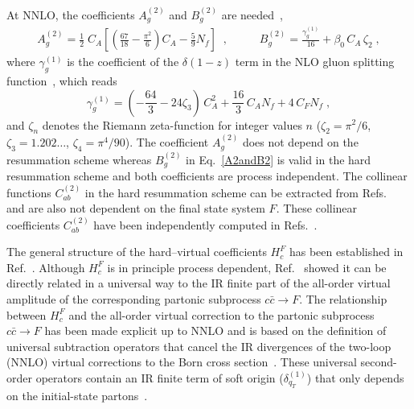 \documentclass[12pt]{article}
\def\beeq{\begin{eqnarray}}
\def\eeeq{\end{eqnarray}}
\newcommand\f[2]{\frac{#1}{#2}}
\def\to{\rightarrow}
\DeclareRobustCommand{\qt}{q_T}
\begin{document}
At NNLO, the coefficients $A^{(2)}_{g}$ and $B^{(2)}_{g}$ are needed~\cite{Bozzi:2005wk,Catani:2013tia,deFlorian:2001zd},
\beeq
\label{A2andB2}
A^{(2)}_{g}= \frac{1}{2}\; C_A \left[ \left( \f{67}{18} - \f{\pi^2}{6}
\right) C_A - \f{5}{9} N_f \right] \;\;,\;\;\;\;\;\;\;\;\;\;B^{(2)}_{g}=\f{\gamma_{g}^{(1)}}{16}+\beta_0\, C_A\,\zeta_2\;,
\eeeq
where $\gamma_{g}^{(1)}$ is the coefficient of the $\delta(1-z)$ term in the NLO gluon splitting function~\cite{Curci:1980uw,Furmanski:1980cm}, which reads
\begin{equation}
\gamma_{g}^{(1)}= \left(-\frac{64}3-24\zeta_3\right)\,C_A^2
+\frac{16}3\,C_A N_f
+4\,C_F N_f\;,
\label{ga1g}
\end{equation}
and $\zeta_n$ denotes the Riemann zeta-function for integer values $n$ ($\zeta_2=\pi^2/6$, $\zeta_3=1.202\dots$, $\zeta_4=\pi^4/90$). The coefficient $A^{(2)}_{g}$ does not depend on the resummation scheme whereas $B^{(2)}_{g}$  in Eq.~\eqref{A2andB2} is valid in the hard resummation scheme and both coefficients are process independent. The collinear functions $C^{(2)}_{ab}$ in the hard resummation scheme can be extracted from Refs.~\cite{Catani:2013tia,Catani:2011kr,Catani:2012qa} and are also not dependent on the final state system $F$. These collinear coefficients $C^{(2)}_{ab}$ have been independently computed in Refs.~\cite{Gehrmann:2012ze,Echevarria:2016scs}.

The general structure of the hard--virtual coefficients $H^{F}_{c}$ has been established in Ref.~\cite{Catani:2013tia}. Although $H^{F}_{c}$ is in principle process dependent, Ref.~\cite{Catani:2013tia} showed it can be directly related in a universal way to the IR finite part of the all-order virtual amplitude of the corresponding partonic subprocess $c{\bar c}\to F$. The relationship between $H^{F}_{c}$ and the all-order virtual correction to the  partonic subprocess $c{\bar c}\to F$ has been made explicit up to NNLO and is based on the definition of universal subtraction operators that cancel the IR divergences of the two-loop (NNLO) virtual corrections to the Born cross section~\cite{Catani:1998bh}. These universal second-order operators contain an IR finite term of soft origin ($\delta^{(1)}_{\qt}$) that only depends on the initial-state partons~\cite{Catani:2013tia}.
\end{document}
